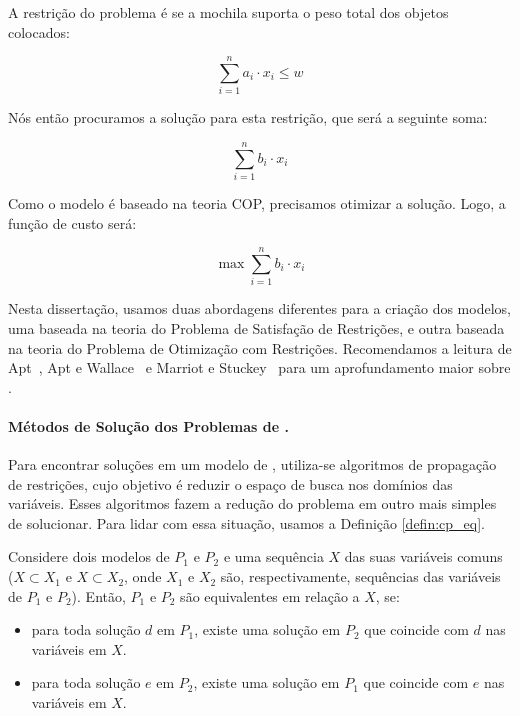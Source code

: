 A restrição do problema é se a mochila suporta o peso total dos
objetos colocados:

\[
    \sum_{i=1}^{n} a_i \cdot x_i \leq w
\]

Nós então procuramos a solução para esta restrição, que será a seguinte 
soma:

\[
    \sum_{i=1}^{n} b_i \cdot x_i
\]

Como o modelo é baseado na teoria COP, precisamos otimizar a solução.
Logo, a função de custo será:

\[
    \max \sum_{i=1}^{n} b_i \cdot x_i
\]

Nesta dissertação, usamos duas abordagens diferentes para a criação dos
modelos, uma baseada na teoria do Problema de Satisfação de Restrições,
e outra baseada na teoria do Problema de Otimização com Restrições.
Recomendamos a leitura de Apt~\cite{Apt*2003}, Apt e
Wallace~\cite{AptWallace*2007} e Marriot e Stuckey~\cite{Marriott*1998}
para um aprofundamento maior sobre \pr{}.

\paragraph{Métodos de Solução dos Problemas de \PR{}.}
Para encontrar soluções em um modelo de \pr{}, utiliza-se algoritmos de
propagação de restrições, cujo objetivo é reduzir o espaço de busca nos
domínios das variáveis. Esses algoritmos fazem a redução do problema em
outro mais simples de solucionar. Para lidar com essa situação, usamos a
Definição \ref{defin:cp_eq}.

\begin{defin}
\label{defin:cp_eq}
    Considere dois modelos de \pr{} $P_{1}$ e $P_{2}$ e uma sequência
    $X$ das suas variáveis comuns ($X \subset X_{1}$ e $X \subset
    X_{2}$, onde $X_{1}$ e $X_{2}$ são, respectivamente, sequências das
    variáveis de $P_{1}$ e $P_{2}$). Então, $P_{1}$ e $P_{2}$ são
    equivalentes em relação a $X$, se:

    \begin{itemize}

        \item{para toda solução $d$ em $P_{1}$, existe uma solução em
            $P_{2}$ que coincide com $d$ nas variáveis em $X$.}

        \item{para toda solução $e$ em $P_{2}$, existe uma solução em
            $P_{1}$ que coincide com $e$ nas variáveis em $X$.}

    \end{itemize}

\end{defin}

